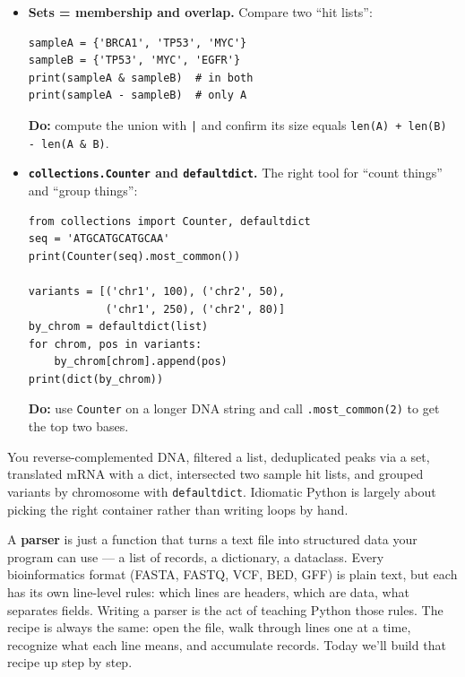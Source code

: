 \begin{itemize}[nosep]
    \textbf{Do:} change one codon in \texttt{mrna} so the protein reads \texttt{MA*}.
  \item \textbf{Sets = membership and overlap.} Compare two ``hit lists'':
    \begin{lstlisting}
sampleA = {'BRCA1', 'TP53', 'MYC'}
sampleB = {'TP53', 'MYC', 'EGFR'}
print(sampleA & sampleB)  # in both
print(sampleA - sampleB)  # only A
    \end{lstlisting}
    \textbf{Do:} compute the union with \texttt{|} and confirm its size equals \texttt{len(A) + len(B) - len(A \& B)}.
  \item \textbf{\texttt{collections.Counter} and \texttt{defaultdict}.} The right tool for ``count things'' and ``group things'':
    \begin{lstlisting}
from collections import Counter, defaultdict
seq = 'ATGCATGCATGCAA'
print(Counter(seq).most_common())

variants = [('chr1', 100), ('chr2', 50),
            ('chr1', 250), ('chr2', 80)]
by_chrom = defaultdict(list)
for chrom, pos in variants:
    by_chrom[chrom].append(pos)
print(dict(by_chrom))
    \end{lstlisting}
    \textbf{Do:} use \texttt{Counter} on a longer DNA string and call \texttt{.most\_common(2)} to get the top two bases.
\end{itemize}
\begin{winbox}[Checkpoint]
You reverse-complemented DNA, filtered a list, deduplicated peaks via a set, translated mRNA with a dict, intersected two sample hit lists, and grouped variants by chromosome with \texttt{defaultdict}. Idiomatic Python is largely about picking the right container rather than writing loops by hand.
\end{winbox}

\begin{brainbox}
A \textbf{parser} is just a function that turns a text file into structured data your program can use --- a list of records, a dictionary, a dataclass. Every bioinformatics format (FASTA, FASTQ, VCF, BED, GFF) is plain text, but each has its own line-level rules: which lines are headers, which are data, what separates fields. Writing a parser is the act of teaching Python those rules. The recipe is always the same: open the file, walk through lines one at a time, recognize what each line means, and accumulate records. Today we'll build that recipe up step by step.
\end{brainbox}

